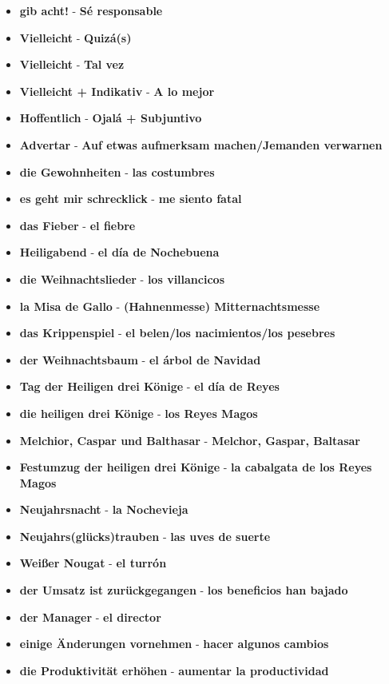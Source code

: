 \documentclass{article}
\begin{document}
\begin{multicols}{2}
\begin{itemize}
		\item{\textbf{gib acht!} - \textbf{Sé responsable}}
		\item{\textbf{Vielleicht} - \textbf{Quizá(s)}}
		\item{\textbf{Vielleicht} - \textbf{Tal vez}}
		\item{\textbf{Vielleicht + Indikativ} - \textbf{A lo mejor}}
		\item{\textbf{Hoffentlich} - \textbf{Ojalá + Subjuntivo}}
		\item{\textbf{Advertar} - \textbf{Auf etwas aufmerksam machen/Jemanden verwarnen}}
		\item{\textbf{die Gewohnheiten} - \textbf{las costumbres}}
		\item{\textbf{es geht mir schrecklick} - \textbf{me siento fatal}}
		\item{\textbf{das Fieber} - \textbf{el fiebre}}
		\item{\textbf{Heiligabend} - \textbf{el día de Nochebuena}}
		\item{\textbf{die Weihnachtslieder} - \textbf{los villancicos}}
		\item{\textbf{la Misa de Gallo} - \textbf{(Hahnenmesse) Mitternachtsmesse}}
		\item{\textbf{das Krippenspiel} - \textbf{el belen/los nacimientos/los pesebres}}
		\item{\textbf{der Weihnachtsbaum} - \textbf{el árbol de Navidad}}
		\item{\textbf{Tag der Heiligen drei Könige} - \textbf{el día de Reyes}}
		\item{\textbf{die heiligen drei Könige} - \textbf{los Reyes Magos}}
		\item{\textbf{Melchior, Caspar und Balthasar} - \textbf{Melchor, Gaspar, Baltasar}}
		\item{\textbf{Festumzug der heiligen drei Könige} - \textbf{la cabalgata de los Reyes Magos}}
		\item{\textbf{Neujahrsnacht} - \textbf{la Nochevieja}}
		\item{\textbf{Neujahrs(glücks)trauben} - \textbf{las uves de suerte}}
		\item{\textbf{Weißer Nougat} - \textbf{el turrón}}
		\item{\textbf{der Umsatz ist zurückgegangen} - \textbf{los beneficios han bajado}}
		\item{\textbf{der Manager} - \textbf{el director}}
		\item{\textbf{einige Änderungen vornehmen} - \textbf{hacer algunos cambios}}
		\item{\textbf{die Produktivität erhöhen} - \textbf{aumentar la productividad}}

\end{itemize}
\end{multicols}
\end{document}
